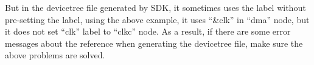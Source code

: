 But in the devicetree file generated by SDK, it sometimes uses the label without pre-setting the label, using the above example, it uses ``\&clk'' in ``dma'' node, but it does not set ``clk'' label to ``clkc'' node. As a result, if there are some error messages about the reference when generating the devicetree file, make sure the above problems are solved.





